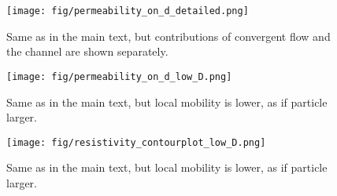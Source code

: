 \documentclass[10pt, a4paper]{article}
\begin{document}
\begin{figure}
    \centering
    \texttt{[image: fig/permeability\_on\_d\_detailed.png]}
    \caption{
        Same as in the main text, but contributions of convergent flow and the channel are shown separately.
        }
    \label{fig:permeability_on_d_detailed}
\end{figure}

\begin{figure}
    \centering
    \texttt{[image: fig/permeability\_on\_d\_low\_D.png]}
    \caption{
        Same as in the main text, but local mobility is lower, as if particle larger.
        }
    \label{fig:permeability_ond_low_D}
\end{figure}

\begin{figure}
    \centering
    \texttt{[image: fig/resistivity\_contourplot\_low\_D.png]}
    \caption{
        Same as in the main text, but local mobility is lower, as if particle larger. 
        }
    \label{fig:resistivity_contourplot_low_d}
\end{figure}
\end{document}
